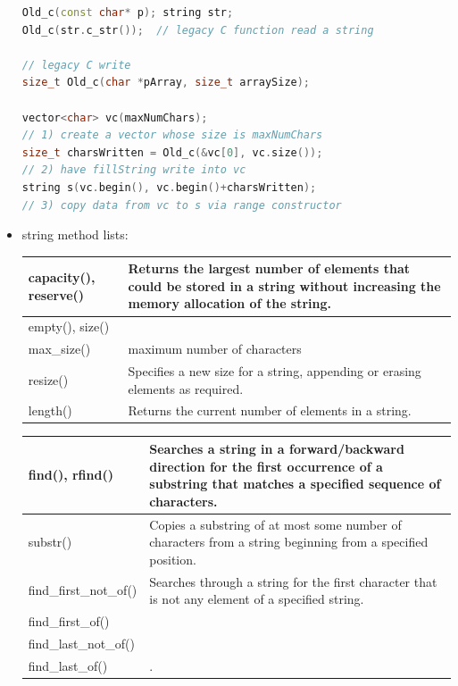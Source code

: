 \documentclass[a4paper,12pt,twoside]{book}
\begin{document}
\begin{itemize}
\begin{lstlisting}[frame=single, language=c++]
Old_c(const char* p); string str;
Old_c(str.c_str());  // legacy C function read a string

// legacy C write
size_t Old_c(char *pArray, size_t arraySize);

vector<char> vc(maxNumChars);
// 1) create a vector whose size is maxNumChars
size_t charsWritten = Old_c(&vc[0], vc.size());
// 2) have fillString write into vc
string s(vc.begin(), vc.begin()+charsWritten);
// 3) copy data from vc to s via range constructor
\end{lstlisting}

\item string method lists:

\begin{tabular}{| p{} |p{}|}
\hline
capacity(), reserve() & Returns the largest number of elements that could be stored in a string without increasing the memory allocation of the string.\\
\hline
empty(),  size()& \\
\hline
max\_size() & maximum number of characters \\
 resize() & Specifies a new size for a string, appending or erasing elements as required.\\
\hline
 length() & Returns the current number of elements in a string.\\
\hline

\end{tabular}

\begin{tabular}{| p{} |p{}|}
\hline
find(), rfind() & Searches a string in a forward/backward direction for the first occurrence of a substring that matches a specified sequence of characters.\\
\hline
substr() & Copies a substring of at most some number of characters from a string beginning from a specified position. \\

\hline
find\_first\_not\_of() & Searches through a string for the first character that is not any element of a specified string.\\
\hline
find\_first\_of() & \\
\hline
find\_last\_not\_of() & \\
\hline
find\_last\_of() & .\\
\hline
\end{tabular}


\end{itemize}
\end{document}
